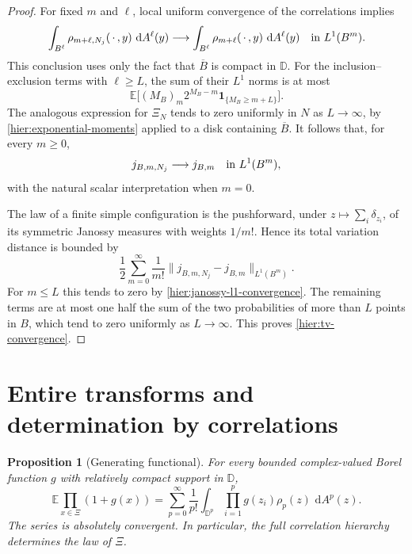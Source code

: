 \documentclass[11pt,a4paper]{article}
\numberwithin{equation}{section}
\newtheorem{proposition}[theorem]{Proposition}
\theoremstyle{definition}
\theoremstyle{remark}
\newcommand{\D}{\mathbb D}
\newcommand{\E}{\mathbb E}
\newcommand{\dd}{\,\mathrm d}
\newcommand{\ind}{\mathbf 1}
\begin{document}
\begin{proof}
For fixed $m$ and $\ell$, local uniform convergence of the
correlations implies
\[
 \int_{B^\ell}\rho_{m+\ell,N_j}(\,\cdot\,,y)\,\dd A^\ell(y)
 \longrightarrow
 \int_{B^\ell}\rho_{m+\ell}(\,\cdot\,,y)\,\dd A^\ell(y)
 \quad\hbox{in }L^1(B^m).
\]
This conclusion uses only the fact that $\overline B$ is compact
in $\D$.  For the inclusion--exclusion terms with $\ell\ge L$,
the sum of their $L^1$ norms is at most
\[
 \E\bigl[(M_B)_m2^{M_B-m}
                  \ind_{\{M_B\ge m+L\}}\bigr].
\]
The analogous expression for $\Xi_N$ tends to zero uniformly in
$N$ as $L\to\infty$, by \eqref{hier:exponential-moments} applied
to a disk containing $\overline B$.  It follows that, for every
$m\ge0$,
\begin{equation}
 j_{B,m,N_j}\longrightarrow j_{B,m}
 \quad\hbox{in }L^1(B^m),
 \label{hier:janossy-l1-convergence}
\end{equation}
with the natural scalar interpretation when $m=0$.

The law of a finite simple configuration is the pushforward, under
$z\mapsto\sum_i\delta_{z_i}$, of its symmetric Janossy measures
with weights $1/m!$.  Hence its total variation distance is bounded
by
\[
 \frac12\sum_{m=0}^{\infty}\frac1{m!}
             \|j_{B,m,N_j}-j_{B,m}\|_{L^1(B^m)}.
\]
For $m\le L$ this tends to zero by
\eqref{hier:janossy-l1-convergence}.  The remaining terms are at
most one half the sum of the two probabilities of more than $L$
points in $B$, which tend to zero uniformly as $L\to\infty$.
This proves \eqref{hier:tv-convergence}.
\end{proof}

\section{Entire transforms and determination by correlations}
\label{hier:transforms-section}

\begin{proposition}[Generating functional]
\label{hier:generating-proposition}
For every bounded complex-valued Borel function $g$ with relatively
compact support in $\D$,
\begin{equation}
 \E\prod_{x\in\Xi}(1+g(x))
 =\sum_{p=0}^{\infty}\frac1{p!}
       \int_{\D^p}\prod_{i=1}^p g(z_i)\rho_p(z)
                        \,\dd A^p(z).
 \label{hier:generating-functional}
\end{equation}
The series is absolutely convergent.  In particular, the full
correlation hierarchy determines the law of $\Xi$.
\end{proposition}
\end{document}
